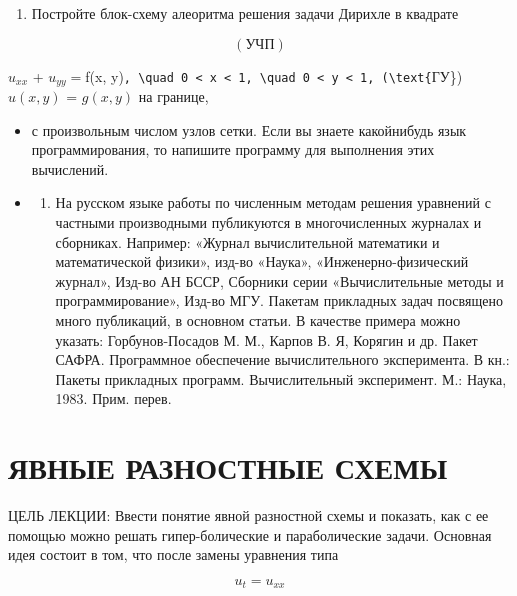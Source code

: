 \documentclass[
  ukrainian,
]{article}
\providecommand{\tightlist}{%
  \setlength{\itemsep}{0pt}\setlength{\parskip}{0pt}}
\begin{document}
\begin{enumerate}
\def\labelenumi{\arabic{enumi}.}
\setcounter{enumi}{5}
\tightlist
\item
  Постройте блок-схему алеоритма решения задачи Дирихле в квадрате
\end{enumerate}

\[
(\text{УЧП})
\]

\(u_{xx}\) + \(u_{yy} =\)f(x,
y)\texttt{,\ \textbackslash{}quad\ 0\ \textless{}\ x\ \textless{}\ 1,\ \textbackslash{}quad\ 0\ \textless{}\ y\ \textless{}\ 1,\ (\textbackslash{}text\{}ГУ\})
\(u(x, y)\) = \(g(x, y)\) на границе,

\begin{itemize}
\item
  с произвольным числом узлов сетки. Если вы знаете какойнибудь язык
  программирования, то напишите программу для выполнения этих
  вычислений.
\item
  \begin{enumerate}
  \def\labelenumi{\arabic{enumi})}
  \tightlist
  \item
    На русском языке работы по численным методам решения уравнений с
    частными производными публикуются в многочисленных журналах и
    сборниках. Например: «Журнал вычислительной математики и
    математической физики», изд-во «Наука», «Инженерно-физический
    журнал», Изд-во АН БССР, Сборники серии «Вычислительные методы и
    программирование», Изд-во МГУ. Пакетам прикладных задач посвящено
    много публикаций, в основном статьи. В качестве примера можно
    указать: Горбунов-Посадов М. М., Карпов В. Я, Корягин и др. Пакет
    САФРА. Программное обеспечение вычислительного эксперимента. В кн.:
    Пакеты прикладных программ. Вычислительный эксперимент. М.: Наука,
    1983. Прим. перев.
  \end{enumerate}
\end{itemize}

\section{ЯВНЫЕ РАЗНОСТНЫЕ
СХЕМЫ}\label{ux44fux432ux43dux44bux435-ux440ux430ux437ux43dux43eux441ux442ux43dux44bux435-ux441ux445ux435ux43cux44b}

ЦЕЛЬ ЛЕКЦИИ: Ввести понятие явной разностной схемы и показать, как с ее
помощью можно решать гипер-болические и параболические задачи. Основная
идея состоит в том, что после замены уравнения типа

\[
u_t = u_{xx}
\]
\end{document}
